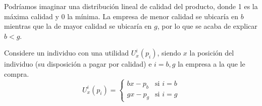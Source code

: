 \documentclass{exam}
\begin{document}
Podríamos imaginar una distribución lineal de calidad del producto, donde 1 es la máxima calidad y 0 la mínima. La empresa de menor calidad se ubicaría en $b$ mientras que la de mayor calidad se ubicaría en $g$, por lo que se acaba de explicar $b<g$.

\begin{center}
\end{center}


Considere un individuo con una utilidad $U_x^i(p_i)$, siendo $x$ la posición del individuo (su disposición a pagar por calidad) e $i = b,g$ la empresa a la que le compra. 
\[
U_x^i (p_i) = 
\begin{cases} 
bx - p_b & \text{si } i = b \\
gx - p_g & \text{si } i = g 
\end{cases}
\]
\end{document}
